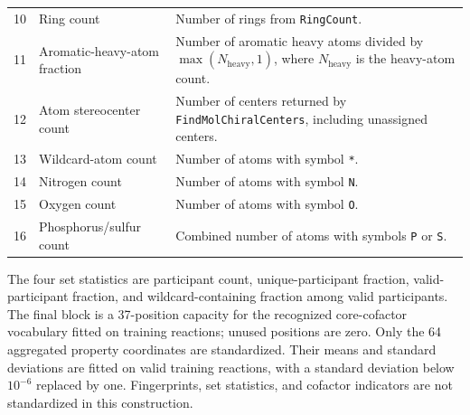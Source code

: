 \begin{longtable}{@{}r>{\raggedright\arraybackslash}p{}>{\raggedright\arraybackslash}p{}@{}}
10 & Ring count & Number of rings from \texttt{RingCount}.\\
11 & Aromatic-heavy-atom fraction & Number of aromatic heavy atoms divided by $\max(N_{\mathrm{heavy}},1)$, where $N_{\mathrm{heavy}}$ is the heavy-atom count.\\
12 & Atom stereocenter count & Number of centers returned by \texttt{FindMolChiralCenters}, including unassigned centers.\\
13 & Wildcard-atom count & Number of atoms with symbol \texttt{*}.\\
14 & Nitrogen count & Number of atoms with symbol \texttt{N}.\\
15 & Oxygen count & Number of atoms with symbol \texttt{O}.\\
16 & Phosphorus/sulfur count & Combined number of atoms with symbols \texttt{P} or \texttt{S}.\\
\bottomrule
\end{longtable}

The four set statistics are participant count, unique-participant fraction,
valid-participant fraction, and wildcard-containing fraction among valid
participants. The final block is a 37-position capacity for the recognized
core-cofactor vocabulary fitted on training reactions; unused positions are
zero. Only the 64 aggregated property coordinates are standardized. Their
means and standard deviations are fitted on valid training reactions, with a
standard deviation below $10^{-6}$ replaced by one. Fingerprints, set
statistics, and cofactor indicators are not standardized in this construction.

